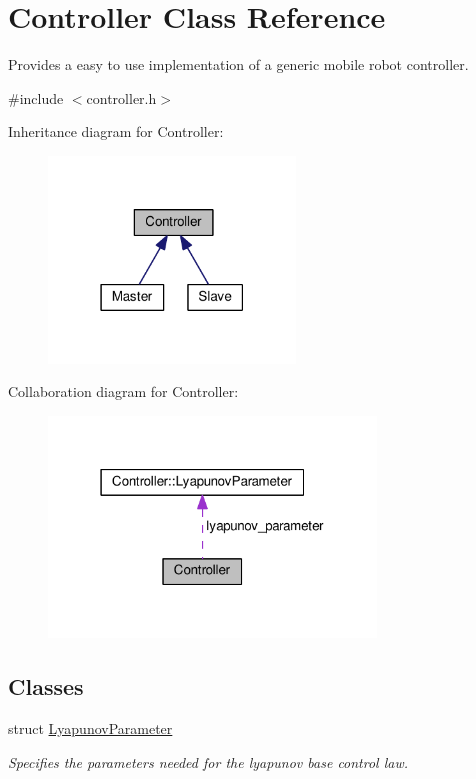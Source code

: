 \hypertarget{classController}{}\section{Controller Class Reference}
\label{classController}


Provides a easy to use implementation of a generic mobile robot controller.  




{\ttfamily \#include $<$controller.\+h$>$}



Inheritance diagram for Controller\+:\nopagebreak
\begin{figure}[H]
\begin{center}
\leavevmode
\includegraphics[width=186pt]{classController__inherit__graph}
\end{center}
\end{figure}


Collaboration diagram for Controller\+:
\nopagebreak
\begin{figure}[H]
\begin{center}
\leavevmode
\includegraphics[width=247pt]{classController__coll__graph}
\end{center}
\end{figure}
\subsection*{Classes}
\begin{DoxyCompactItemize}
\item 
struct \hyperlink{structController_1_1LyapunovParameter}{Lyapunov\+Parameter}
\begin{DoxyCompactList}\small\item\em Specifies the parameters needed for the lyapunov base control law. \end{DoxyCompactList}\end{DoxyCompactItemize}
